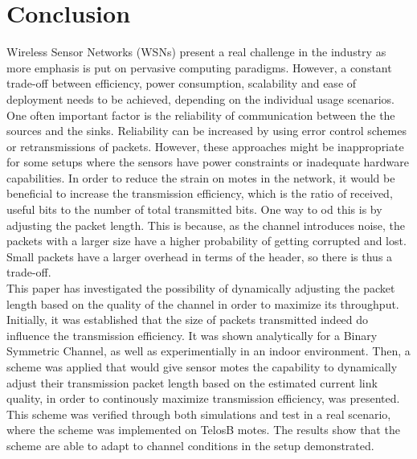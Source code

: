 \section{Conclusion\label{sec:conclusion}}
Wireless Sensor Networks (WSNs) present a real challenge in the industry as more emphasis is put on pervasive computing paradigms. However, a constant trade-off between efficiency, power consumption, scalability and ease of deployment needs to be achieved, depending on the individual usage scenarios. One often important factor is the reliability of communication between the the sources and the sinks. Reliability can be increased by using error control schemes or retransmissions of packets. However, these approaches might be inappropriate for some setups where the sensors have power constraints or inadequate hardware capabilities. 
In order to reduce the strain on motes in the network, it would be beneficial to increase the transmission efficiency, which is the ratio of received, useful bits to the number of total transmitted bits. One way to od this is by adjusting the packet length. This is because, as the channel introduces noise, the packets with a larger size have a higher probability of getting corrupted and lost. Small packets have a larger overhead in terms of the header, so there is thus a trade-off.
\\[8pt]
This paper has investigated the possibility of dynamically adjusting the packet length based on the quality of the channel in order to maximize its throughput. Initially, it was established that the size of packets transmitted indeed do influence the transmission efficiency. It was shown analytically for a Binary Symmetric Channel, as well as experimentially in an indoor environment. Then, a scheme was applied that would give sensor motes the capability to dynamically adjust their transmission packet length based on the estimated current link quality, in order to continously maximize transmission efficiency, was presented. This scheme was verified through both simulations and test in a real scenario, where the scheme was implemented on TelosB motes. The results show that the scheme are able to adapt to channel conditions in the setup demonstrated. 
